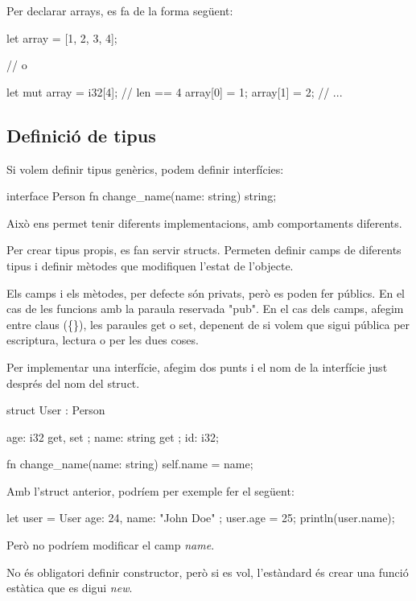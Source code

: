 ﻿\documentclass{article}
\begin{document}
Per declarar arrays, es fa de la forma següent:

\begin{code}
let array = [1, 2, 3, 4];

// o

let mut array = i32[4]; // len == 4
array[0] = 1;
array[1] = 2;
// ...
\end{code}

\subsection{Definició de tipus}

Si volem definir tipus genèrics, podem definir interfícies:

\begin{code}
interface Person {
    fn change_name(name: string) string;
}
\end{code}

Això ens permet tenir diferents implementacions, amb comportaments diferents.

Per crear tipus propis, es fan servir structs. Permeten definir camps de diferents
tipus i definir mètodes que modifiquen l'estat de l'objecte.

Els camps i els mètodes, per defecte són privats, però es poden fer públics.
En el cas de les funcions amb la paraula reservada "pub". En el cas dels camps,
afegim entre claus (\{\}), les paraules get o set, depenent de si volem que sigui pública
per escriptura, lectura o per les dues coses.

Per implementar una interfície, afegim dos punts i el nom de la interfície just
després del nom del struct.

\begin{code}
struct User : Person {
    age: i32 { get, set };
    name: string { get };
    id: i32;

    fn change_name(name: string) {
        self.name = name;
    }
}
\end{code}

Amb l'struct anterior, podríem per exemple fer el següent:

\begin{code}
let user = User { age: 24, name: "John Doe" };
user.age = 25;
println(user.name);
\end{code}

Però no podríem modificar el camp \textit{name}.

No és obligatori definir constructor, però si es vol, l'estàndard és crear una
funció estàtica que es digui \textit{new}.
\end{document}
